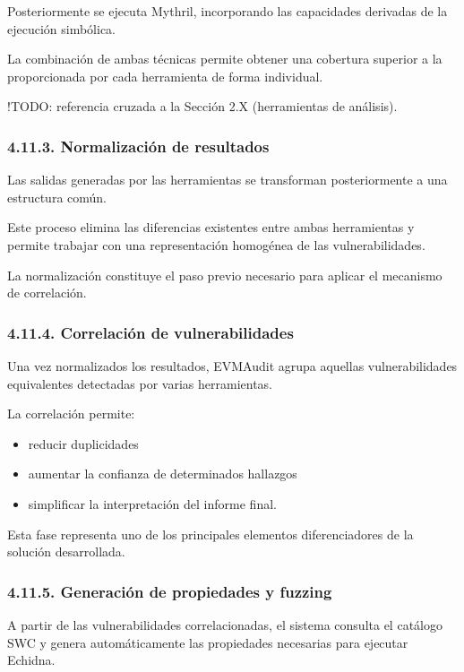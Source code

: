Posteriormente se ejecuta Mythril, incorporando las capacidades
derivadas de la ejecución simbólica.

La combinación de ambas técnicas permite obtener una cobertura superior
a la proporcionada por cada herramienta de forma individual.

!TODO: referencia cruzada a la Sección 2.X (herramientas de análisis).

\subsubsection{4.11.3. Normalización de
resultados}\label{normalizaciuxf3n-de-resultados}

Las salidas generadas por las herramientas se transforman posteriormente
a una estructura común.

Este proceso elimina las diferencias existentes entre ambas herramientas
y permite trabajar con una representación homogénea de las
vulnerabilidades.

La normalización constituye el paso previo necesario para aplicar el
mecanismo de correlación.

\subsubsection{4.11.4. Correlación de
vulnerabilidades}\label{correlaciuxf3n-de-vulnerabilidades}

Una vez normalizados los resultados, EVMAudit agrupa aquellas
vulnerabilidades equivalentes detectadas por varias herramientas.

La correlación permite:

\begin{itemize}
\tightlist
\item
  reducir duplicidades
\item
  aumentar la confianza de determinados hallazgos
\item
  simplificar la interpretación del informe final.
\end{itemize}

Esta fase representa uno de los principales elementos diferenciadores de
la solución desarrollada.

\subsubsection{4.11.5. Generación de propiedades y
fuzzing}\label{generaciuxf3n-de-propiedades-y-fuzzing}

A partir de las vulnerabilidades correlacionadas, el sistema consulta el
catálogo SWC y genera automáticamente las propiedades necesarias para
ejecutar Echidna.


